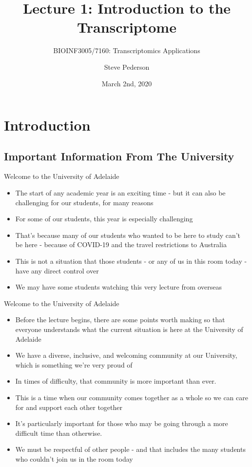 \documentclass[11pt]{beamer}
\author{Steve Pederson}
\title{Lecture 1: Introduction to the Transcriptome}
\subtitle{BIOINF3005/7160: Transcriptomics Applications}
\institute{University of Adelaide}
\date{March 2nd, 2020}
\begin{document}
\begin{frame}
\titlepage
\end{frame}

\begin{frame}
\tableofcontents
\end{frame}

\section{Introduction}

\subsection{Important Information From The University}

\begin{frame}{Welcome to the University of Adelaide}

	\begin{itemize}
		\item The start of any academic year is an exciting time - but it can also be challenging for our students, for many reasons
		\item For some of our students, this year is especially challenging
		\item That’s because many of our students who wanted to be here to study can’t be here - because of COVID-19 and the travel restrictions to Australia
		\item This is not a situation that those students - or any of us in this room today - have any direct control over
		\item We may have some students watching this very lecture from overseas
	\end{itemize}
	
\end{frame}

\begin{frame}{Welcome to the University of Adelaide}

	\begin{itemize}
		\item Before the lecture begins, there are some points worth making so that everyone understands what the current situation is here at the University of Adelaide
		\item We have a diverse, inclusive, and welcoming community at our University, which is something we’re very proud of
		\item In times of difficulty, that community is more important than ever.
		\item This is a time when our community comes together as a whole so we can care for and support each other together
		\item It’s particularly important for those who may be going through a more difficult time than otherwise. 
		\item We must be respectful of other people - and that includes the many students who couldn’t join us in the room today
	\end{itemize}

\end{frame}
\end{document}
